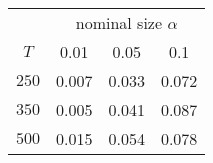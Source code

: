 % 

\renewcommand{\arraystretch}{1.2}
\begin{tabular}{cccc}
\hline
      & \multicolumn{3}{c}{nominal size $\alpha$} \\
$T$   & 0.01 & 0.05 & 0.1 \\ 
\hline
$250$ & 0.007 & 0.033 & 0.072 \\ 
$350$ & 0.005 & 0.041 & 0.087 \\ 
$500$ & 0.015 & 0.054 & 0.078 \\ 
\hline
\end{tabular}

